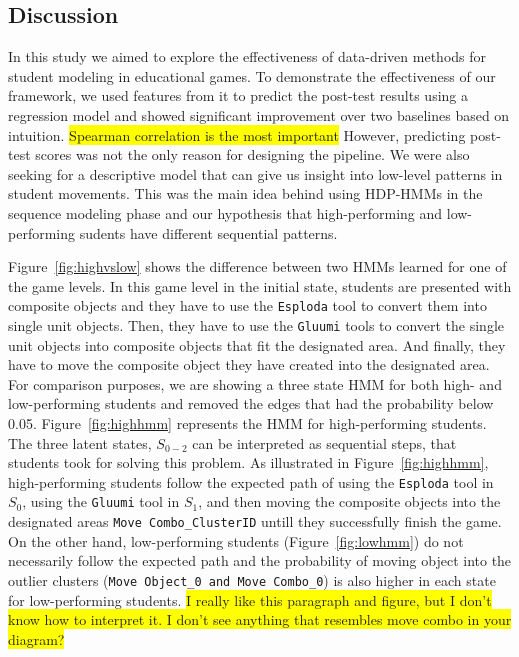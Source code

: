 \documentclass{sigchi}
\newcommand{\hl}[1]{\colorbox{yellow}{#1}}
\begin{document}
\subsection{Discussion}
In this study we aimed to explore the effectiveness of data-driven methods for student modeling in educational games. 
To demonstrate the effectiveness of our framework, we used features from it to predict the post-test results using a regression model and showed significant improvement over two  baselines based on intuition. 
\hl{Spearman correlation is the most important}
However, predicting post-test scores was not the only reason for designing the pipeline. 
We were also seeking for a descriptive model that can give us insight into low-level patterns in student movements. 
This was the main idea behind using HDP-HMMs in the sequence modeling phase and our hypothesis that high-performing and low-performing sudents have different sequential patterns. 

Figure~\ref{fig:highvslow} shows the difference between two HMMs learned for one of the game levels.
In this game level in the initial state, students are presented with composite objects and they have to use the \texttt{Esploda} tool to convert them into single unit objects. 
Then, they have to use the \texttt{Gluumi} tools to convert the single unit objects into composite objects that fit the designated area. 
And finally, they have to move the composite object they have created into the designated area.
For comparison purposes, we are showing a three state HMM for both high- and low-performing students and removed the edges that had the probability below 0.05. 
Figure~\ref{fig:highhmm} represents the HMM for high-performing students. 
The three latent states, $S_{0-2}$ can be interpreted as sequential steps, that students took for solving this problem. As illustrated in Figure~\ref{fig:highhmm}, high-performing students follow the expected path of using the \texttt{Esploda} tool in $S_0$, using the \texttt{Gluumi} tool in $S_1$, and then moving the composite objects into the designated areas \texttt{Move Combo\_{ClusterID}} untill they successfully finish the game.
On the other hand, low-performing students (Figure~\ref{fig:lowhmm}) do not necessarily follow the expected path and the probability of moving object into the outlier clusters (\texttt{Move Object\_0 and Move Combo\_0}) is also higher in each state for low-performing students.
\hl{I really like this paragraph and figure, but I don't know how to interpret it.  I don't see anything that resembles move combo in your diagram?}
\end{document}
